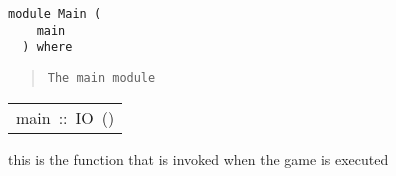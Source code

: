 \label{module:Main}
\haddockbeginheader
{\haddockverb\begin{verbatim}
module Main (
    main
  ) where\end{verbatim}}
\haddockendheader

\begin{quote}
{\haddockverb\begin{verbatim}
The main module\end{verbatim}}
\end{quote}

\begin{haddockdesc}
\item[\begin{tabular}{@{}l}
main\ ::\ IO\ ()
\end{tabular}]\haddockbegindoc
{} this is the function that is invoked when the game is executed\par

\end{haddockdesc}